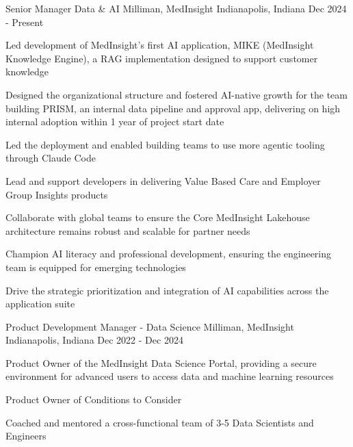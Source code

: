 

\begin{cventries}

  \cventry
    {Senior Manager Data \& AI} %
    {Milliman, MedInsight} %
    {Indianapolis, Indiana} %
    {Dec 2024 - Present} %
    {
      \begin{cvitems} %
        \item {Led development of MedInsight's first AI application, MIKE (MedInsight Knowledge Engine), a RAG implementation designed to support customer knowledge}
        \item {Designed the organizational structure and fostered AI-native growth for the team building PRISM, an internal data pipeline and approval app, delivering on high internal adoption within 1 year of project start date}
        \item {Led the deployment and enabled building teams to use more agentic tooling through Claude Code}
        \item {Lead and support developers in delivering Value Based Care and Employer Group Insights products}
        \item {Collaborate with global teams to ensure the Core MedInsight Lakehouse architecture remains robust and scalable for partner needs}
        \item {Champion AI literacy and professional development, ensuring the engineering team is equipped for emerging technologies}
        \item {Drive the strategic prioritization and integration of AI capabilities across the application suite}
      \end{cvitems}
    }

  \cventry
    {Product Development Manager - Data Science} %
    {Milliman, MedInsight} %
    {Indianapolis, Indiana} %
    {Dec 2022 - Dec 2024} %
    {
      \begin{cvitems} %
        \item {Product Owner of the MedInsight Data Science Portal, providing a secure environment for advanced users to access data and machine learning resources}
        \item {Product Owner of Conditions to Consider}
        \item {Coached and mentored a cross-functional team of 3-5 Data Scientists and Engineers}
      \end{cvitems}
    }


\end{cventries}
